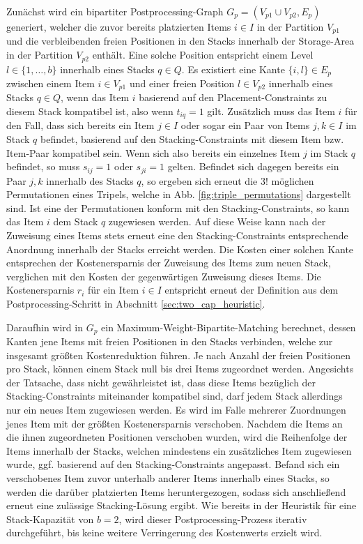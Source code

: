 Zunächst wird ein bipartiter Postprocessing-Graph $G_p = (V_{p1} \cup V_{p2}, E_p)$ generiert,
welcher die zuvor bereits platzierten Items $i \in I$ in der Partition $V_{p1}$ und die verbleibenden
freien Positionen in den Stacks innerhalb der Storage-Area in der Partition $V_{p2}$ enthält.
Eine solche Position entspricht einem Level $l \in \{1, \dotsc, b\}$ innerhalb eines Stacks $q \in Q$.
Es existiert eine Kante $\{i, l\} \in E_p$ zwischen einem Item $i \in V_{p1}$ und einer freien
Position $l \in V_{p2}$ innerhalb eines Stacks $q \in Q$, wenn das Item $i$ basierend auf den Placement-Constraints
zu diesem Stack kompatibel ist, also wenn $t_{iq} = 1$ gilt.
Zusätzlich muss das Item $i$ für den Fall, dass sich bereits ein Item $j \in I$ oder sogar ein Paar von Items $j, k \in I$
im Stack $q$ befindet, basierend auf den Stacking-Constraints mit diesem Item bzw. Item-Paar kompatibel sein.
Wenn sich also bereits ein einzelnes Item $j$ im Stack $q$ befindet, so muss $s_{ij} = 1$ oder $s_{ji} = 1$ gelten.
Befindet sich dagegen bereits ein Paar $j, k$ innerhalb des Stacks $q$, so ergeben sich erneut die $3!$ möglichen Permutationen
eines Tripels, welche in Abb. \ref{fig:triple_permutations} dargestellt sind. Ist eine der Permutationen konform mit den Stacking-Constraints, so kann das Item $i$ dem Stack $q$ zugewiesen werden. Auf diese Weise kann nach der Zuweisung eines Items stets erneut eine den Stacking-Constraints entsprechende Anordnung innerhalb der Stacks erreicht werden.
Die Kosten einer solchen Kante entsprechen der Kostenersparnis der Zuweisung des Items zum neuen Stack, verglichen mit den Kosten der gegenwärtigen Zuweisung dieses Items. Die Kostenersparnis $r_i$ für ein Item $i \in I$ entspricht erneut der Definition aus dem Postprocessing-Schritt in Abschnitt \ref{sec:two_cap_heuristic}.

Daraufhin wird in $G_p$ ein Maximum-Weight-Bipartite-Matching berechnet, dessen Kanten jene Items
mit freien Positionen in den Stacks verbinden, welche zur insgesamt größten Kostenreduktion führen.
Je nach Anzahl der freien Positionen pro Stack, können einem Stack null bis drei Items zugeordnet werden.
Angesichts der Tatsache, dass nicht gewährleistet ist, dass diese Items bezüglich der Stacking-Constraints miteinander kompatibel sind, darf jedem Stack allerdings nur ein neues Item zugewiesen werden.
Es wird im Falle mehrerer Zuordnungen jenes Item mit der größten Kostenersparnis verschoben.
Nachdem die Items an die ihnen zugeordneten Positionen verschoben wurden, wird die Reihenfolge der Items
innerhalb der Stacks, welchen mindestens ein zusätzliches Item zugewiesen wurde, ggf. basierend auf den Stacking-Constraints angepasst. Befand sich ein verschobenes Item zuvor unterhalb anderer Items innerhalb eines Stacks, so werden die darüber platzierten Items heruntergezogen, sodass sich anschließend erneut eine zulässige Stacking-Lösung ergibt.
Wie bereits in der Heuristik für eine Stack-Kapazität von $b = 2$, wird dieser Postprocessing-Prozess
iterativ durchgeführt, bis keine weitere Verringerung des Kostenwerts erzielt wird.

